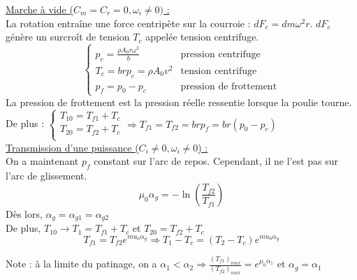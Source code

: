 \documentclass[../main.tex]{subfiles}
\begin{document}
\quad \underline{Marche à vide ($C_m = C_r = 0, \omega_i \neq 0)$ :}\\
La rotation entraîne une force centripète sur la courroie : $dF_c = dm \omega^2 r$. $dF_c$ génère un surcroît de tension $T_c$ appelée tension centrifuge.\\

\begin{equation}
    \begin{cases}
        p_c = \frac{\rho A_0 r \omega^2}{b} & \text{pression centrifuge}\\
        T_c = brp_c = \rho A_0 v^2 & \text{tension centrifuge}\\
        p_f = p_0 - p_c & \text{pression de frottement}
    \end{cases}
\end{equation}
La pression de frottement est la pression réelle ressentie lorsque la poulie tourne.\\

De plus : $\begin{cases}
    T_{10} = T_{f1} + T_c\\
    T_{20} = T_{f2} + T_c\\
\end{cases} \Rightarrow T_{f1} = T_{f2} = brp_f = br(p_0-p_c)$\\

\quad \underline{Transmission d'une puissance ($C_i \neq 0, \omega_i \neq 0$) :}\\
On a maintenant $p_f$ constant sur l'arc de repos. Cependant, il ne l'est pas sur l'arc de glissement. \\
\begin{equation}
    \mu_0 \alpha_g = -\ln{(\frac{T_{f2}}{T_{f1}})}
\end{equation}
Dès lors, $\alpha_g = \alpha_{g1} = \alpha_{g2}$\\
De plus, $T_{10} \rightarrow T_1 = T_{f1} + T_c$ et $T_{20} = T_{f2} +T_c$\\

\begin{equation}
    T_{f1} = T_{f2} e^{mu_0 \alpha_g} \Rightarrow T_1-T_c = (T_2-T_c) e^{mu_0 \alpha_g}
\end{equation}

\color{gray}Note : à la limite du patinage, on a $\alpha_1<\alpha_2 \Rightarrow \frac{(T_{f1})_{max}}{(T_{f2})_{max}} = e^{\mu_0 \alpha_1}$ et $\alpha_g = \alpha_1$\color{black}\\
\end{document}
